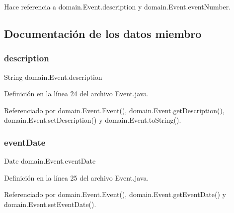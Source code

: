 Hace referencia a domain.\+Event.\+description y domain.\+Event.\+event\+Number.



\subsection{Documentación de los datos miembro}
\mbox{\label{classdomain_1_1Event_a14d38176e81b4e75c84d4aaea994a306}} 
\subsubsection{\texorpdfstring{description}{description}}
{\footnotesize\ttfamily String domain.\+Event.\+description\hspace{0.3cm}{\ttfamily [private]}}



Definición en la línea 24 del archivo Event.\+java.



Referenciado por domain.\+Event.\+Event(), domain.\+Event.\+get\+Description(), domain.\+Event.\+set\+Description() y domain.\+Event.\+to\+String().

\mbox{\label{classdomain_1_1Event_a3cc1c6dde4868b8048cc2dc0626cd269}} 
\subsubsection{\texorpdfstring{eventDate}{eventDate}}
{\footnotesize\ttfamily Date domain.\+Event.\+event\+Date\hspace{0.3cm}{\ttfamily [private]}}



Definición en la línea 25 del archivo Event.\+java.



Referenciado por domain.\+Event.\+Event(), domain.\+Event.\+get\+Event\+Date() y domain.\+Event.\+set\+Event\+Date().

\mbox{\label{classdomain_1_1Event_a7a297461605e871f55e9752c5652a07e}} 
